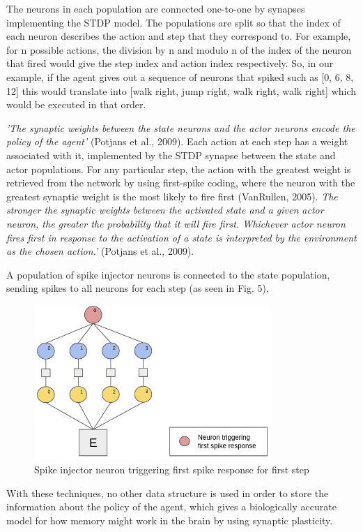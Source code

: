 \documentclass[10pt]{article}
\begin{document}
    The neurons in each population are connected one-to-one by synapses implementing the STDP model. The populations are split so that the index of each neuron describes the action and step that they correspond to. For example, for n possible actions, the division by n and modulo n of the index of the neuron that fired would give the step index and action index respectively. So, in our example, if the agent gives out a sequence of neurons that spiked such as [0, 6, 8, 12] this would translate into [walk right, jump right, walk right, walk right] which would be executed in that order.

    \textit{'The synaptic weights between the state neurons and the actor neurons encode the policy of the agent'} (Potjans et al., 2009). Each action at each step has a weight associated with it, implemented by the STDP synapse between the state and actor populations. For any particular step, the action with the greatest weight is retrieved from the network by using first-spike coding, where the neuron with the greatest synaptic weight is the most likely to fire first (VanRullen, 2005). \textit{The stronger the synaptic weights between the activated state and a given actor
    neuron, the greater the probability that it will fire first. Whichever actor
    neuron fires first in response to the activation of a state is interpreted by
    the environment as the chosen action.'} (Potjans et al., 2009).
    
    A population of spike injector neurons is connected to the state population, sending spikes to all neurons for each step (as seen in Fig. 5).

    \begin{figure}[ht!]
    \centering
    \includegraphics[width=90mm]{./firstSpike.png}
    \caption{Spike injector neuron triggering first spike response for first step \label{overflow}}
    \end{figure}

    With these techniques, no other data structure is used in order to store the information about the policy of the agent, which gives a biologically accurate model for how memory might work in the brain by using synaptic plasticity.
\end{document}

